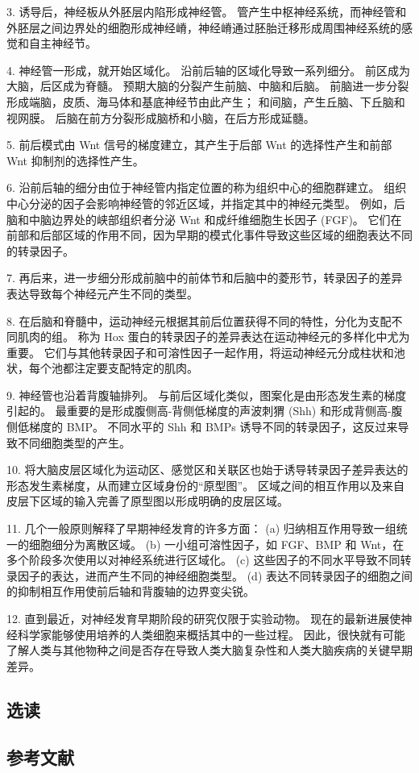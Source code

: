 3. 诱导后，神经板从外胚层内陷形成神经管。 管产生中枢神经系统，而神经管和外胚层之间边界处的细胞形成神经嵴，神经嵴通过胚胎迁移形成周围神经系统的感觉和自主神经节。 

4. 神经管一形成，就开始区域化。 沿前后轴的区域化导致一系列细分。 前区成为大脑，后区成为脊髓。 预期大脑的分裂产生前脑、中脑和后脑。 前脑进一步分裂形成端脑，皮质、海马体和基底神经节由此产生； 和间脑，产生丘脑、下丘脑和视网膜。 后脑在前方分裂形成脑桥和小脑，在后方形成延髓。 

5. 前后模式由 Wnt 信号的梯度建立，其产生于后部 Wnt 的选择性产生和前部 Wnt 抑制剂的选择性产生。 

6. 沿前后轴的细分由位于神经管内指定位置的称为组织中心的细胞群建立。 组织中心分泌的因子会影响神经管的邻近区域，并指定其中的神经元类型。 例如，后脑和中脑边界处的峡部组织者分泌 Wnt 和成纤维细胞生长因子 (FGF)。 它们在前部和后部区域的作用不同，因为早期的模式化事件导致这些区域的细胞表达不同的转录因子。

7. 再后来，进一步细分形成前脑中的前体节和后脑中的菱形节，转录因子的差异表达导致每个神经元产生不同的类型。 

8. 在后脑和脊髓中，运动神经元根据其前后位置获得不同的特性，分化为支配不同肌肉的组。 称为 Hox 蛋白的转录因子的差异表达在运动神经元的多样化中尤为重要。 它们与其他转录因子和可溶性因子一起作用，将运动神经元分成柱状和池状，每个池都注定要支配特定的肌肉。 

9. 神经管也沿着背腹轴排列。 与前后区域化类似，图案化是由形态发生素的梯度引起的。 最重要的是形成腹侧高-背侧低梯度的声波刺猬 (Shh) 和形成背侧高-腹侧低梯度的 BMP。 不同水平的 Shh 和 BMPs 诱导不同的转录因子，这反过来导致不同细胞类型的产生。 

10. 将大脑皮层区域化为运动区、感觉区和关联区也始于诱导转录因子差异表达的形态发生素梯度，从而建立区域身份的“原型图”。 区域之间的相互作用以及来自皮层下区域的输入完善了原型图以形成明确的皮层区域。 

11. 几个一般原则解释了早期神经发育的许多方面： (a) 归纳相互作用导致一组统一的细胞细分为离散区域。 (b) 一小组可溶性因子，如 FGF、BMP 和 Wnt，在多个阶段多次使用以对神经系统进行区域化。 (c) 这些因子的不同水平导致不同转录因子的表达，进而产生不同的神经细胞类型。 (d) 表达不同转录因子的细胞之间的抑制相互作用使前后轴和背腹轴的边界变尖锐。 

12. 直到最近，对神经发育早期阶段的研究仅限于实验动物。 现在的最新进展使神经科学家能够使用培养的人类细胞来概括其中的一些过程。 因此，很快就有可能了解人类与其他物种之间是否存在导致人类大脑复杂性和人类大脑疾病的关键早期差异。

\subsection{选读}
\subsection{参考文献}
